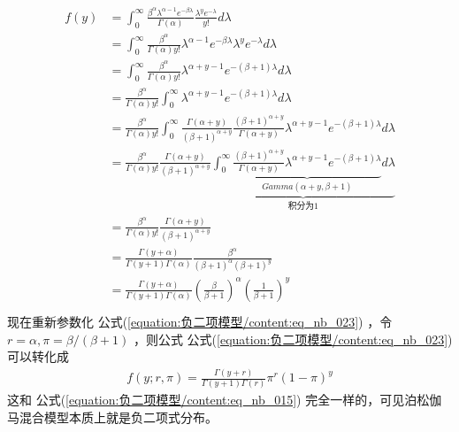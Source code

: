 \documentclass[letterpaper,10pt,english]{sphinxmanual}
\begin{document}
\begin{align}\label{equation:负二项模型/content:eq_nb_023}\!\begin{aligned}
f(y) &=  \int_0^{\infty}
\frac{ \beta^{\alpha} \lambda^{\alpha-1} e^{-\beta \lambda  }   }{ \Gamma(\alpha)}
\frac{\lambda^y e^{-\lambda}} {y!} d \lambda\\
&= \int_0^{\infty} \frac{ \beta^{\alpha} }{ \Gamma(\alpha) y!}
  \lambda^{\alpha-1} e^{- \beta \lambda } \lambda^y e^{-\lambda}  d \lambda\\
&= \int_0^{\infty} \frac{ \beta^{\alpha} }{ \Gamma(\alpha) y!}
  \lambda^{\alpha+y-1} e^{- (\beta+1) \lambda }  d \lambda\\
&=  \frac{ \beta^{\alpha} }{ \Gamma(\alpha) y!} \int_0^{\infty}
  \lambda^{\alpha+y-1} e^{- (\beta+1) \lambda }  d \lambda\\
&=  \frac{ \beta^{\alpha} }{ \Gamma(\alpha) y!}
    \int_0^{\infty}
    \frac{ \Gamma(\alpha+y)}{ (\beta+1)^{\alpha+y} }
    \frac{  (\beta+1)^{\alpha+y} }{ \Gamma(\alpha+y)}
    \lambda^{\alpha+y-1} e^{- (\beta+1) \lambda }  d \lambda\\
&=  \frac{ \beta^{\alpha} }{ \Gamma(\alpha) y!}
    \frac{ \Gamma(\alpha+y)}{ (\beta+1)^{\alpha+y} }
    \underbrace{\int_0^{\infty}
    \underbrace{ \frac{  (\beta+1)^{\alpha+y} }{ \Gamma(\alpha+y)}
    \lambda^{\alpha+y-1} e^{- (\beta+1) \lambda } }_{ Gamma(\alpha+y,\beta+1)  }  d \lambda }_{\text{积分为1}}\\
&=  \frac{ \beta^{\alpha} }{ \Gamma(\alpha) y!}
    \frac{ \Gamma(\alpha+y)}{ (\beta+1)^{\alpha+y} }\\
&= \frac{\Gamma(y+\alpha)  }{\Gamma(y+1) \Gamma(\alpha) }
    \frac{\beta^{\alpha}}{(\beta+1)^{\alpha} (\beta+1)^{y} }\\
&= \frac{\Gamma(y+\alpha)  }{\Gamma(y+1) \Gamma(\alpha) }
    \left ( \frac{\beta}{\beta+1} \right )^{\alpha}
    \left ( \frac{1}{\beta+1} \right )^{y}\\
\end{aligned}\end{align}
现在重新参数化 公式(\ref{equation:负二项模型/content:eq_nb_023}) ，令 \(r=\alpha,\pi=\beta/(\beta+1)\)
，则公式 公式(\ref{equation:负二项模型/content:eq_nb_023}) 可以转化成
\begin{equation}\label{equation:负二项模型/content:eq_nb_024}
\begin{split}f(y;r,\pi) =\frac{\Gamma(y+r)  }{\Gamma(y+1) \Gamma(r) }
\pi^r (1-\pi)^y\end{split}
\end{equation}
这和 公式(\ref{equation:负二项模型/content:eq_nb_015}) 完全一样的，可见泊松\sphinxhyphen{}伽马混合模型本质上就是负二项式分布。
\end{document}
